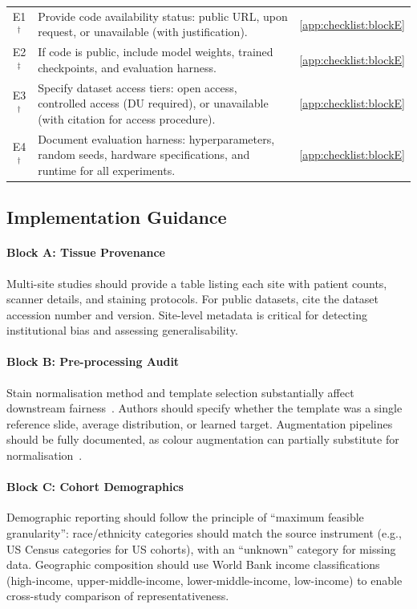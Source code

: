 \begin{table}[htbp]
\begin{tabularx}{\linewidth}{@{}c p{10.5cm} X@{}}
    E1$^\dagger$ & Provide code availability status: public URL, upon request, or unavailable (with justification). & \ref{app:checklist:blockE} \\
    E2$^\ddagger$ & If code is public, include model weights, trained checkpoints, and evaluation harness. & \ref{app:checklist:blockE} \\
    E3$^\dagger$ & Specify dataset access tiers: open access, controlled access (DU required), or unavailable (with citation for access procedure). & \ref{app:checklist:blockE} \\
    E4$^\dagger$ & Document evaluation harness: hyperparameters, random seeds, hardware specifications, and runtime for all experiments. & \ref{app:checklist:blockE} \\
    \bottomrule
  \end{tabularx}
\end{table}

\subsection*{Implementation Guidance}

\paragraph{Block A: Tissue Provenance}
Multi-site studies should provide a table listing each site with patient counts, scanner details, and staining protocols. For public datasets, cite the dataset accession number and version. Site-level metadata is critical for detecting institutional bias and assessing generalisability.

\paragraph{Block B: Pre-processing Audit}
Stain normalisation method and template selection substantially affect downstream fairness~\citep{voon2023evaluating, lin2025stain}. Authors should specify whether the template was a single reference slide, average distribution, or learned target. Augmentation pipelines should be fully documented, as colour augmentation can partially substitute for normalisation~\citep{franchet2024bias}.

\paragraph{Block C: Cohort Demographics}
Demographic reporting should follow the principle of ``maximum feasible granularity'': race/ethnicity categories should match the source instrument (e.g., US Census categories for US cohorts), with an ``unknown'' category for missing data. Geographic composition should use World Bank income classifications (high-income, upper-middle-income, lower-middle-income, low-income) to enable cross-study comparison of representativeness.

